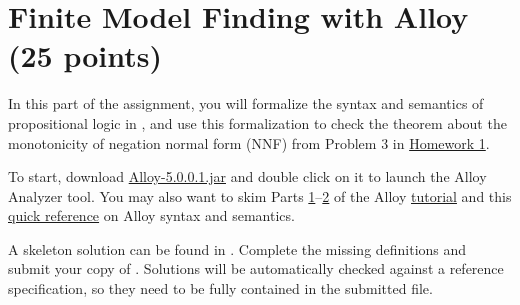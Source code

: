 \documentclass{handout}
\begin{document}
\section{Finite Model Finding with Alloy (25 points)}

In this part of the assignment, you will formalize the syntax and semantics of
propositional logic in \alloy, and use this formalization to check the theorem
about the monotonicity of negation normal form (NNF) from Problem 3 in
\href{\website/doc/hw1.pdf}{Homework 1}.

To start, download
\href{https://github.com/AlloyTools/org.alloytools.alloy/releases/download/v5.0.0.1/Alloy-5.0.0.1.jar}{Alloy-5.0.0.1.jar}
and double click on it to launch the Alloy Analyzer tool.  You may also want to
skim Parts
\href{http://alloytools.org/tutorials/day-course/s1_logic.pdf}{1}--\href{http://alloytools.org/tutorials/day-course/s2_language.pdf}{2}
of the Alloy \href{http://alloytools.org/tutorials/day-course/}{tutorial} and
this
\href{http://homepage.cs.uiowa.edu/~tinelli/classes/181/Fall17/Notes/alloy-cheatsheet.pdf}{quick
reference} on Alloy syntax and semantics.

A skeleton solution can be found in .  Complete the missing
definitions and submit your copy of .  Solutions will be
automatically checked against a reference specification, so they need to be
fully contained in the submitted file.
\end{document}
